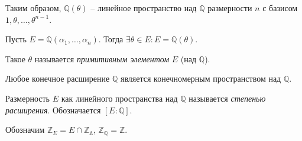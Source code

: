 Таким образом, $\mathbb{Q}(\theta)$ -- линейное пространство над $\mathbb{Q}$ размерности $n$ с базисом $1, \theta, \ldots, \theta^{n - 1}$.

\begin{theorem} \label{l11_th4}
	Пусть $E = \mathbb{Q}(\alpha_1, \ldots, \alpha_n)$. Тогда $\exists \theta \in E: E = \mathbb{Q}(\theta)$.
\end{theorem}

\begin{definition}
	Такое $\theta$ называется \textit{примитивным элементом} $E$ (над $\mathbb{Q}$).
\end{definition}

\begin{corollary}
	Любое конечное расширение $\mathbb{Q}$ является конечномерным пространством над $\mathbb{Q}$.
\end{corollary}

\begin{definition}
	Размерность $E$ как линейного пространства над $\mathbb{Q}$ называется \textit{степенью расширения}.
	Обозначается $[E \colon \mathbb{Q}]$.
\end{definition}

Обозначим $\mathbb{Z}_E = E \cap \mathbb{Z_A}$, $\mathbb{Z_Q} = \mathbb{Z}$.